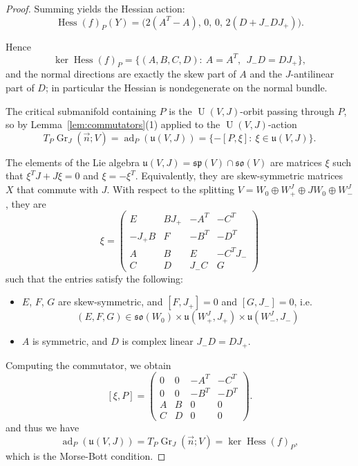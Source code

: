 \documentclass[12pt, final]{article}
\def\ad{\operatorname{ad}}
\def\Hess{\operatorname{Hess}}
\def\U{\operatorname{U}}
\def\Gr{\operatorname{Gr}}
\def\sp{\mathfrak{sp}}
\def\so{\mathfrak{so}}
\def\u{\mathfrak{u}}
\begin{document}
\begin{proof}
Summing yields the Hessian action:
\begin{equation}\label{eq:hessian-action-correct}
\Hess(f)_P(Y) =  \big(2(A^T-A),\,0,\,0,\,2(D+J_-DJ_+)\big).
\end{equation}

Hence
\begin{equation}\label{eq:ker-hess-correct}
\ker \Hess(f)_P=\{(A,B,C,D):\ A=A^T,\ \ J_-D=DJ_+\},
\end{equation}
and the normal directions are exactly the skew part of $A$ and the $J$-antilinear part of $D$; in particular the Hessian is nondegenerate on the normal bundle.

\smallskip
The critical submanifold containing $P$ is the $\U(V,J)$-orbit passing through $P$, so by Lemma~\ref{lem:commutators}(1) applied to the $\U(V,J)$-action
\[
T_P\Gr_J(\vec n;V)=\ad_P(\u(V,J))=\{-[P,\xi]:\ \xi\in\u(V,J)\}.
\]

The elements of the Lie algebra $\u(V, J) = \sp(V) \cap \so(V)$ are matrices $\xi$ such that $\xi^TJ + J\xi = 0$ and $\xi = -\xi^T$. Equivalently, they are skew-symmetric matrices $X$ that commute with $J$. With respect to the splitting $V = W_0\oplus W_+^J\oplus JW_0\oplus W_-^J$, they are
\[ \xi = \begin{pmatrix} E & BJ_+ & -A^T & -C^T \\ -J_+ B & F & - B^T & -D^T \\ A & B & E & -C^TJ_- \\ C & D & J_-C & G \end{pmatrix} \]
such that the entries satisfy the following:
\begin{itemize}
    \item $E$, $F$, $G$ are skew-symmetric, and $[F, J_+] = 0$ and $[G, J_-] = 0$, i.e.
\[ (E, F, G) \in \so(W_0) \times \u(W_+^J, J_+) \times \u(W_-^J, J_-)\]
\item $A$ is symmetric, and $D$ is complex linear $J_-D = DJ_+$.
\end{itemize}
Computing the commutator, we obtain
\[ [\xi, P] = \begin{pmatrix} 0 & 0 & -A^T & -C^T \\ 0 & 0 & - B^T & -D^T \\ A & B & 0 & 0 \\ C & D & 0 & 0 \end{pmatrix}.\]
and thus we have
\[ \ad_P(\u(V, J)) = T_P\Gr_J(\vec{n}; V) = \ker \Hess(f)_P,\]
which is the Morse-Bott condition.
\end{proof}
\end{document}
